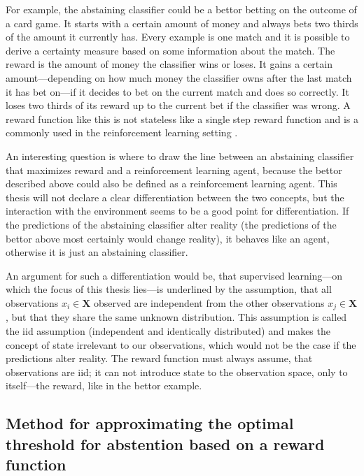 \documentclass[twoside,11pt]{article}
\def\X{\textbf{X}}
\begin{document}
For example, the abstaining classifier could be a bettor
betting on the outcome of a card game.
It starts with a certain amount of money and always bets
two thirds of the amount it currently has.
Every example is one match and it is possible to derive a
certainty measure based on some information about the
match.
The reward is the amount of money the classifier wins or
loses.
It gains a certain amount---depending on how much money the
classifier owns after the last match it has bet on---if
it decides to bet on the current match and does so
correctly. It loses two thirds of its reward up to the
current bet if the classifier was wrong.
A reward function like this is not stateless like a
single step reward function and is a commonly used
in the reinforcement learning setting
\citep[see][Chapter 1]{sutton_et_al_2018}.

An interesting question is where to draw the line between
an abstaining classifier that maximizes reward and a
reinforcement learning agent, because the bettor described
above could also be defined as a reinforcement learning
agent.
This thesis will not declare a clear differentiation
between the two concepts, but the interaction with the
environment seems to be a good point for differentiation.
If the predictions of the abstaining classifier alter
reality (the predictions of the bettor above most certainly
would change reality), it behaves like an agent, otherwise
it is just an abstaining classifier.

An argument for such a differentiation would be, that
supervised learning---on which the focus of this thesis
lies---is underlined by the assumption, that all
observations $x_i \in \X$ observed are independent from the
other observations $x_j \in \X$, but that they share the
same unknown distribution.
This assumption is called the iid assumption (independent
and identically distributed) \citep[see][]{clauset_2011}
and makes the concept of state irrelevant to our
observations, which would not be the case if the
predictions alter reality.
The reward function must always assume, that observations
are iid; it can not introduce state to the observation
space, only to itself---the reward, like in the bettor
example.

\subsection{Method for approximating the optimal threshold
  for abstention based on a reward function}
\end{document}
